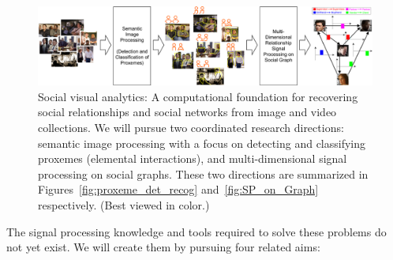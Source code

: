 \begin{figure}[t!]
\begin{center}
\includegraphics[width=\columnwidth]{overview}
\end{center}
\vspace{-0.25in} \caption{\captionsize 
Social visual analytics: A computational foundation for recovering social relationships and social networks from image and video collections. We will pursue two coordinated research directions: semantic image processing with a focus on detecting and classifying proxemes (elemental interactions), and multi-dimensional signal processing on social graphs. These two directions are summarized in Figures~\ref{fig:proxeme_det_recog} and~\ref{fig:SP_on_Graph} respectively. (Best viewed in color.)\label{fig:intro}\afterfigspace}
\end{figure}

The signal processing knowledge and tools required to solve these problems do not yet exist. We will create them by pursuing four related aims:

